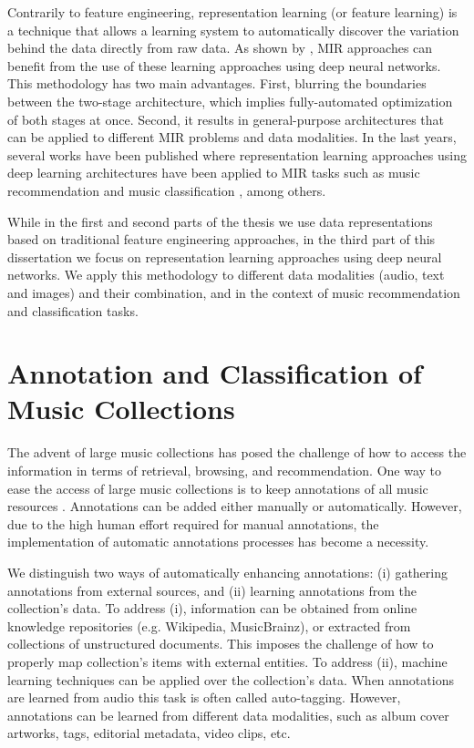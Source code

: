 Contrarily to feature engineering, representation learning (or feature learning) is a technique that allows a learning system to automatically discover the variation behind the data directly from raw data. As shown by \cite{humphrey2012}, MIR approaches can benefit from the use of these learning approaches using deep neural networks. This methodology has two main advantages. First, blurring the boundaries between the two-stage architecture, which implies fully-automated optimization of both stages at once. Second, it results in general-purpose architectures that can be applied to different MIR problems and data modalities. In the last years, several works have been published where representation learning approaches using deep learning architectures have been applied to MIR tasks such as music recommendation \citep{Oord2013} and music classification \citep{Choi2016}, among others.

While in the first and second parts of the thesis we use data representations based on traditional feature engineering approaches, in the third part of this dissertation we focus on representation learning approaches using deep neural networks. We apply this methodology to different data modalities (audio, text and images) and their combination, and in the context of music recommendation and classification tasks.


\section{Annotation and Classification of Music Collections}
\label{sec:intro:annotation}

The advent of large music collections has posed the challenge of how to access the information in terms of retrieval, browsing, and recommendation. One way to ease the access of large music collections is to keep annotations of all music resources \citep{sordo2012semantic}. Annotations can be added either manually or automatically. 
However, due to the high human effort required for manual annotations, the implementation of automatic annotations processes has become a necessity. 

We distinguish two ways of automatically enhancing annotations: (i) gathering annotations from external sources, and (ii) learning annotations from the collection's data. To address (i), information can be obtained from online knowledge repositories (e.g. Wikipedia, MusicBrainz), or extracted from collections of unstructured documents. This imposes the challenge of how to properly map collection's items with external entities. To address (ii), machine learning techniques can be applied over the collection's data. When annotations are learned from audio this task is often called auto-tagging. However, annotations can be learned from different data modalities, such as album cover artworks, tags, editorial metadata, video clips, etc.

